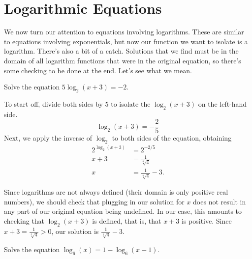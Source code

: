 \documentclass[nooutcomes]{ximera}
\begin{document}
\section{Logarithmic Equations}
We now turn our attention to equations involving logarithms. These are similar to equations involving exponentials, but now our function we want to isolate is a logarithm. There's also a bit of a catch. Solutions that we find must be in the domain of all logarithm functions that were in the original equation, so there's some checking to be done at the end. Let's see what we mean. 

\begin{example}
Solve the equation $5\log_2(x + 3) = -2$. 
\end{example}
\begin{explanation}
To start off, divide both sides by 5 to isolate the $\log_2(x + 3)$ on the left-hand side.
$$
\log_2(x + 3) = -\frac{2}{5}
$$
Next, we apply the inverse of $\log_2$ to both sides of the equation, obtaining
\begin{align*}
2^{\log_2(x + 3)} & = 2^{-2/5} \\
x + 3 & = \frac{1}{\sqrt[5]{4}} \\
x & = \frac{1}{\sqrt[5]{4}} - 3.
\end{align*}

Since logarithms are not always defined (their domain is only positive real numbers), we should check that plugging in our solution for $x$ does not result in any part of our original equation being undefined. In our case, this amounts to checking that $\log_2(x + 3)$ is defined, that is, that $x + 3$ is positive. Since $x + 3 = \frac{1}{\sqrt[5]{4}} > 0$, our solution is $\frac{1}{\sqrt[5]{4}} - 3$.
\end{explanation}

\begin{example}
Solve the equation $\log_6(x) = 1 - \log_6(x - 1)$.
\end{example}
\end{document}
